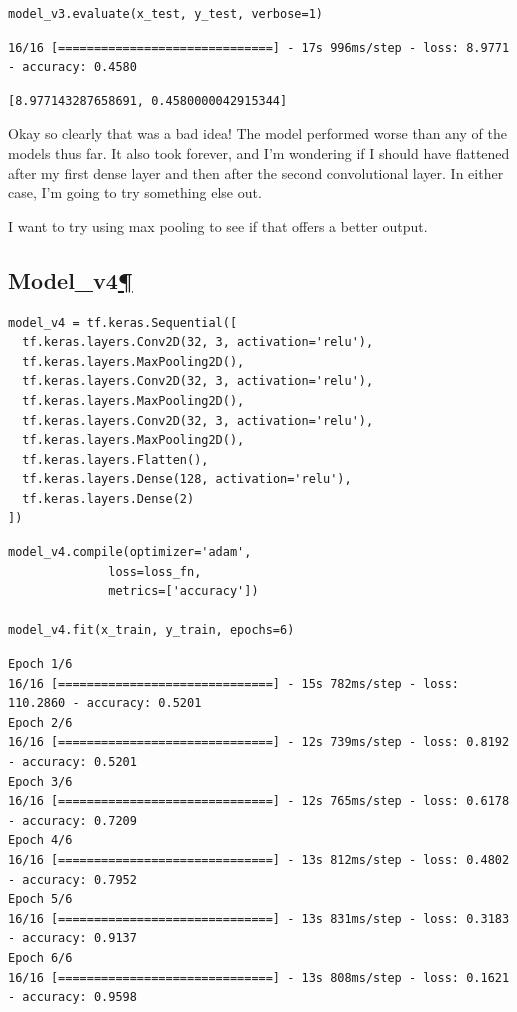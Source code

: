 \documentclass[
]{article}
\begin{document}
\begin{Verbatim}[frame=single]
model_v3.evaluate(x_test, y_test, verbose=1)
\end{Verbatim}

\begin{verbatim}
16/16 [==============================] - 17s 996ms/step - loss: 8.9771 - accuracy: 0.4580
\end{verbatim}

\begin{verbatim}
[8.977143287658691, 0.4580000042915344]
\end{verbatim}

Okay so clearly that was a bad idea! The model performed worse than any
of the models thus far. It also took forever, and I'm wondering if I
should have flattened after my first dense layer and then after the
second convolutional layer. In either case, I'm going to try something
else out.

I want to try using max pooling to see if that offers a better output.
\newpage

\hypertarget{Model_v4}{%
\subsection{\texorpdfstring{Model\_v4\protect\hyperlink{Model_v4}{¶}}{Model\_v4¶}}\label{Model_v4}}

\begin{Verbatim}[frame=single]
model_v4 = tf.keras.Sequential([
  tf.keras.layers.Conv2D(32, 3, activation='relu'),
  tf.keras.layers.MaxPooling2D(),
  tf.keras.layers.Conv2D(32, 3, activation='relu'),
  tf.keras.layers.MaxPooling2D(),
  tf.keras.layers.Conv2D(32, 3, activation='relu'),
  tf.keras.layers.MaxPooling2D(),
  tf.keras.layers.Flatten(),
  tf.keras.layers.Dense(128, activation='relu'),
  tf.keras.layers.Dense(2)
])
\end{Verbatim}

\begin{Verbatim}[frame=single]
model_v4.compile(optimizer='adam',
              loss=loss_fn,
              metrics=['accuracy'])

model_v4.fit(x_train, y_train, epochs=6)
\end{Verbatim}

\begin{verbatim}
Epoch 1/6
16/16 [==============================] - 15s 782ms/step - loss: 110.2860 - accuracy: 0.5201
Epoch 2/6
16/16 [==============================] - 12s 739ms/step - loss: 0.8192 - accuracy: 0.5201
Epoch 3/6
16/16 [==============================] - 12s 765ms/step - loss: 0.6178 - accuracy: 0.7209
Epoch 4/6
16/16 [==============================] - 13s 812ms/step - loss: 0.4802 - accuracy: 0.7952
Epoch 5/6
16/16 [==============================] - 13s 831ms/step - loss: 0.3183 - accuracy: 0.9137
Epoch 6/6
16/16 [==============================] - 13s 808ms/step - loss: 0.1621 - accuracy: 0.9598
\end{verbatim}
\end{document}
